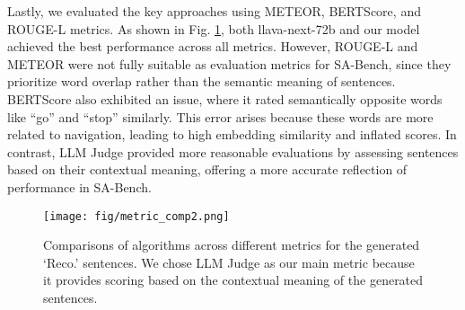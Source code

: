 Lastly, we evaluated the key approaches using METEOR, BERTScore, and ROUGE-L metrics.
As shown in Fig. \ref{fig:metric_comp}, both llava-next-72b and our model achieved the best performance across all metrics. However, ROUGE-L and METEOR were not fully suitable as evaluation metrics for SA-Bench, since they prioritize word overlap rather than the semantic meaning of sentences. 
BERTScore also exhibited an issue, where it rated semantically opposite words like ``go'' and ``stop'' similarly. 
This error arises because these words are more related to navigation, leading to high embedding similarity and inflated scores.
In contrast, LLM Judge provided more reasonable evaluations by assessing sentences based on their contextual meaning, offering a more accurate reflection of performance in SA-Bench.

\begin{figure}[b!]
    \centering
    \vspace{-15pt}
    \texttt{[image: fig/metric\_comp2.png]} %
    \vspace{-25pt}
    \caption{Comparisons of algorithms across different metrics for the generated `Reco.' sentences. We chose LLM Judge as our main metric because it provides scoring based on the contextual meaning of the generated sentences.}
    \label{fig:metric_comp}
\end{figure}

